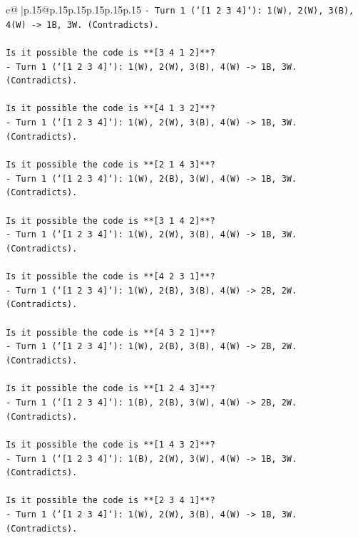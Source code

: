 \documentclass{article}
\begin{document}
{\begin{supertabular}{c@{$\;$}|p{.15\linewidth}@{}p{.15\linewidth}p{.15\linewidth}p{.15\linewidth}p{.15\linewidth}p{.15\linewidth}}
{{{\texttt{{-} Turn 1 (`{[}1 2 3 4{]}`): 1(W), 2(W), 3(B), 4(W) {-}> 1B, 3W. (Contradicts).} \\
\\ 
\texttt{Is it possible the code is **{[}3 4 1 2{]}**?} \\
\texttt{{-} Turn 1 (`{[}1 2 3 4{]}`): 1(W), 2(W), 3(B), 4(W) {-}> 1B, 3W. (Contradicts).} \\
\\ 
\texttt{Is it possible the code is **{[}4 1 3 2{]}**?} \\
\texttt{{-} Turn 1 (`{[}1 2 3 4{]}`): 1(W), 2(W), 3(B), 4(W) {-}> 1B, 3W. (Contradicts).} \\
\\ 
\texttt{Is it possible the code is **{[}2 1 4 3{]}**?} \\
\texttt{{-} Turn 1 (`{[}1 2 3 4{]}`): 1(W), 2(B), 3(W), 4(W) {-}> 1B, 3W. (Contradicts).} \\
\\ 
\texttt{Is it possible the code is **{[}3 1 4 2{]}**?} \\
\texttt{{-} Turn 1 (`{[}1 2 3 4{]}`): 1(W), 2(W), 3(B), 4(W) {-}> 1B, 3W. (Contradicts).} \\
\\ 
\texttt{Is it possible the code is **{[}4 2 3 1{]}**?} \\
\texttt{{-} Turn 1 (`{[}1 2 3 4{]}`): 1(W), 2(B), 3(B), 4(W) {-}> 2B, 2W. (Contradicts).} \\
\\ 
\texttt{Is it possible the code is **{[}4 3 2 1{]}**?} \\
\texttt{{-} Turn 1 (`{[}1 2 3 4{]}`): 1(W), 2(B), 3(B), 4(W) {-}> 2B, 2W. (Contradicts).} \\
\\ 
\texttt{Is it possible the code is **{[}1 2 4 3{]}**?} \\
\texttt{{-} Turn 1 (`{[}1 2 3 4{]}`): 1(B), 2(B), 3(W), 4(W) {-}> 2B, 2W. (Contradicts).} \\
\\ 
\texttt{Is it possible the code is **{[}1 4 3 2{]}**?} \\
\texttt{{-} Turn 1 (`{[}1 2 3 4{]}`): 1(B), 2(W), 3(W), 4(W) {-}> 1B, 3W. (Contradicts).} \\
\\ 
\texttt{Is it possible the code is **{[}2 3 4 1{]}**?} \\
\texttt{{-} Turn 1 (`{[}1 2 3 4{]}`): 1(W), 2(W), 3(B), 4(W) {-}> 1B, 3W. (Contradicts).} \\
}}}
\end{supertabular}}
\end{document}
